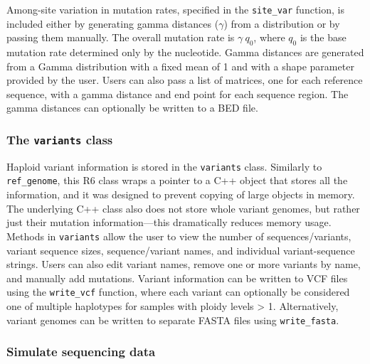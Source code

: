 \documentclass[12pt,]{article}
\begin{document}
Among-site variation in mutation rates, specified in the \texttt{site\_var} function,
is included either by generating gamma distances (\(\gamma\)) from a distribution
or by passing them manually.
The overall mutation rate is \(\gamma ~ q_{0}\), where
\(q_{0}\) is the base mutation rate determined only by the nucleotide.
Gamma distances are generated from a Gamma distribution with a fixed mean of 1
and with a shape parameter provided by the user.
Users can also pass a list of matrices, one for each reference sequence,
with a gamma distance and end point for each sequence region.
The gamma distances can optionally be written to a BED file.

\hypertarget{the-variants-class}{%
\subsubsection{\texorpdfstring{The \texttt{variants} class}{The variants class}}\label{the-variants-class}}

Haploid variant information is stored in the \texttt{variants} class.
Similarly to \texttt{ref\_genome}, this R6 class wraps a pointer to a C++ object
that stores all the information, and it was designed to prevent copying of large
objects in memory.
The underlying C++ class also does not store whole variant genomes, but
rather just their mutation information---this dramatically reduces memory usage.
Methods in \texttt{variants} allow the user to view the number of sequences/variants,
variant sequence sizes, sequence/variant names, and individual variant-sequence strings.
Users can also edit variant names, remove one or more variants by name,
and manually add mutations.
Variant information can be written to VCF files using the \texttt{write\_vcf} function,
where each variant can optionally be considered one of multiple haplotypes for
samples with ploidy levels \textgreater{} 1.
Alternatively, variant genomes can be written to separate FASTA files
using \texttt{write\_fasta}.

\hypertarget{simulate-sequencing-data}{%
\subsubsection{Simulate sequencing data}\label{simulate-sequencing-data}}
\end{document}
